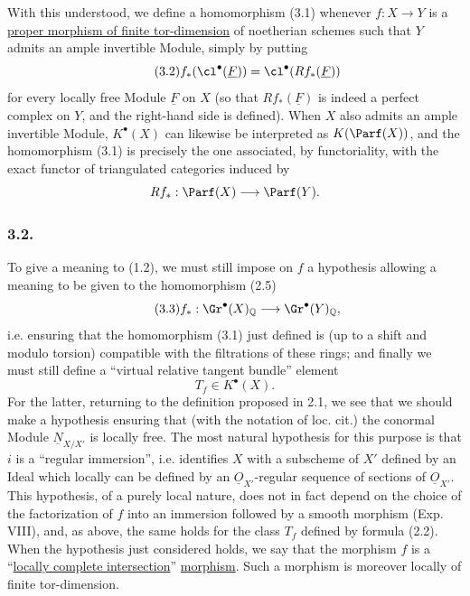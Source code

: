 With this understood, we define a homomorphism (3.1) whenever $f:X\to Y$ is a \underline{proper morphism of finite tor-dimension} of noetherian schemes such that $Y$ admits an ample invertible Module, simply by putting
\begin{equation}\tag{3.2}
f_*(\cl^\bullet(\underline F))=\cl^\bullet(Rf_*(\underline F))
\end{equation}
for every locally free Module $\underline F$ on $X$ (so that $Rf_*(\underline F)$ is indeed a perfect complex on $Y$, and the right-hand side is defined). When $X$ also admits an ample invertible Module, $K^\bullet(X)$ can likewise be interpreted as $K(\Parf(X))$, and the homomorphism (3.1) is precisely the one associated, by functoriality, with the exact functor of triangulated categories induced by
\[
Rf_*:\Parf(X)\longrightarrow \Parf(Y).
\]

\subsubsection*{3.2.}
To give a meaning to (1.2), we must still impose on $f$ a hypothesis allowing a meaning to be given to the homomorphism (2.5)
\begin{equation}\tag{3.3}
f_*:\Gr^\bullet(X)_{\mathbb Q}\longrightarrow \Gr^\bullet(Y)_{\mathbb Q},
\end{equation}
i.e. ensuring that the homomorphism (3.1) just defined is (up to a shift and modulo torsion) compatible with the filtrations of these rings; and finally we must still define a ``virtual relative tangent bundle'' element
\[
T_f\in K^\bullet(X).
\]
For the latter, returning to the definition proposed in 2.1, we see that we should make a hypothesis ensuring that (with the notation of loc. cit.) the conormal Module $\underline N_{X/X'}$ is locally free. The most natural hypothesis for this purpose is that $i$ is a ``regular immersion'', i.e. identifies $X$ with a subscheme of $X'$ defined by an Ideal which locally can be defined by an $\underline O_{X'}$-regular sequence of sections of $\underline O_{X'}$. This hypothesis, of a purely local nature, does not in fact depend on the choice of the factorization of $f$ into an immersion followed by a smooth morphism (Exp. VIII), and, as above, the same holds for the class $T_f$ defined by formula (2.2). When the hypothesis just considered holds, we say that the morphism $f$ is a ``\underline{locally complete intersection}'' \underline{morphism}. Such a morphism is moreover locally of finite tor-dimension.

